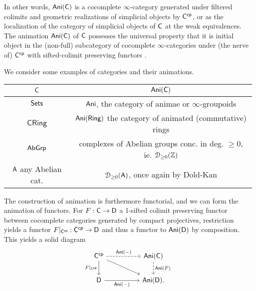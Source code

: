 In other words, $\mathsf{Ani}(\mathsf{C})$ is a cocomplete $\infty$-category generated under filtered colimits and geometric realizations of simplicial objects by $\mathsf{C}^{\mathsf{cp}}$, or as the localization of the category of simplicial objects of $\mathsf{C}$ at the weak equivalences. The animation $\mathsf{Ani}(\mathsf{C})$ of $\mathsf{C}$ possesses the universal property that it is initial object in the (non-full) subcategory of cocomplete $\infty$-categories under (the nerve of) $\mathsf{C}^{\mathsf{cp}}$ with sifted-colimit preserving functors \cite[\S 5.1.4]{PurityFlatCohomology}. 
\begin{example}\label{ex: animations}
    We consider some examples of categories and their animations. 
        \begin{center}
        \begin{tabular}{| c | c |}
        \hline 
        $\mathsf{C}$ & $\mathsf{Ani}(\mathsf{C})$ \\\hline
        $\mathsf{Sets}$ & $\mathsf{Ani}$, the category of animae or $\infty$-groupoids \\\hline
        $\mathsf{CRing}$ & $\mathsf{Ani}(\mathsf{Ring})$ the category of animated (commutative) rings \\\hline
        $\mathsf{AbGrp}$ & complexes of Abelian groups conc. in deg. $\geq0$, ie. $\EuScript{D}_{\geq0}(\mathbb{Z})$ \\\hline
        $\mathsf{A}$ any Abelian cat. & $\EuScript{D}_{\geq0}(\mathsf{A})$, once again by Dold-Kan \\\hline
    \end{tabular}
    \end{center}
\end{example}
The construction of animation is furthermore functorial, and we can form the animation of functors. For $F:\mathsf{C}\to\mathsf{D}$ a 1-sifted colimit preserving functor between cocomplete categories generated by compact projectives, restriction yields a functor $F|_{\mathsf{C}^{\mathsf{cp}}}:\mathsf{C}^{\mathsf{cp}}\to\mathsf{D}$ and thus a functor to $\mathsf{Ani}(\mathsf{D})$ by composition. This yields a solid diagram 
$$%
\begin{tikzcd}
	{\Csf^{\mathsf{cp}}} && {\Ani(\Csf)} \\
	\Dsf && {\Ani(\Dsf).}
	\arrow["{\Ani(-)}", dashed, from=1-1, to=1-3]
	\arrow["{F|_{\Csf^{\mathsf{cp}}}}"', from=1-1, to=2-1]
	\arrow[from=1-1, to=2-3]
	\arrow["{\Ani(F)}", dashed, from=1-3, to=2-3]
	\arrow["{\Ani(-)}"', from=2-1, to=2-3]
\end{tikzcd}$$
